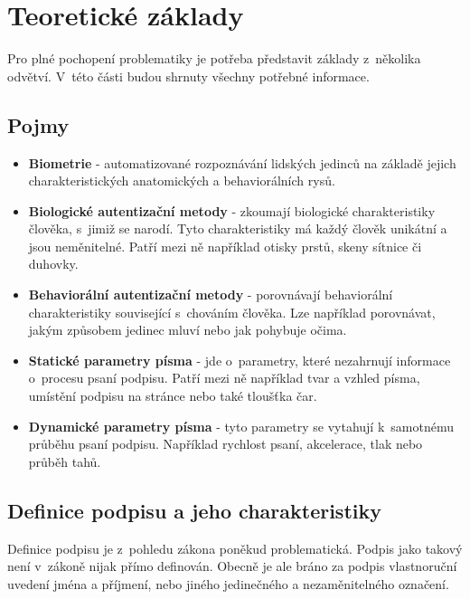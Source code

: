 
\chapter{Teoretické základy}
Pro plné pochopení problematiky je potřeba představit základy z~několika odvětví. 
V~této části budou shrnuty všechny potřebné informace. 

\section{Pojmy}
\label{sec:pojmy}
\begin{itemize}
  \item{\textbf{Biometrie} - automatizované rozpoznávání lidských jedinců na základě jejich charakteristických anatomických a behaviorálních rysů.} %
  \item{\textbf{Biologické autentizační metody} - zkoumají biologické charakteristiky člověka, s~jimiž se narodí. Tyto charakteristiky má každý člověk unikátní a jsou neměnitelné. Patří mezi ně například otisky prstů, skeny sítnice či duhovky.}  
  \item{\textbf{Behaviorální autentizační metody} - porovnávají behaviorální charakteristiky související s~chováním člověka. Lze například porovnávat, jakým způsobem jedinec mluví nebo jak pohybuje očima.}
  \item{\textbf{Statické parametry písma} - jde o~parametry, které nezahrnují informace o~procesu psaní podpisu. Patří mezi ně například tvar a vzhled písma, umístění podpisu na stránce nebo také tloušťka čar.}
  \item{\textbf{Dynamické parametry písma} - tyto parametry se vytahují k~samotnému průběhu psaní podpisu. Například rychlost psaní, akcelerace, tlak nebo průběh tahů.}
\end{itemize}

\section{Definice podpisu a jeho charakteristiky}
Definice podpisu je z~pohledu zákona poněkud problematická. 
Podpis jako takový není v~zákoně nijak přímo definován. 
Obecně je ale bráno za podpis vlastnoruční uvedení jména a příjmení, nebo jiného jedinečného a nezaměnitelného označení. %

